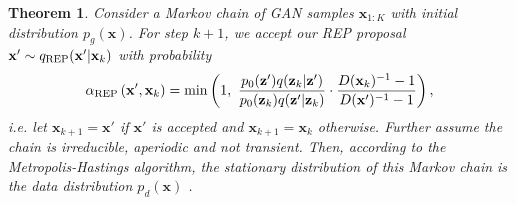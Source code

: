 \documentclass{article} %
\newcommand{\bx}{\mathbf{x}}
\newcommand{\bz}{\mathbf{z}}
\newcommand{\<}{\left\langle}
\renewcommand{\>}{\right\rangle}
\newtheorem{theorem}{Theorem}
\begin{document}
\begin{theorem}
\label{thm:emh}
Consider a Markov chain of GAN samples $\bx_{1:K}$ with initial distribution $p_g(\bx)$. For step $k+1$, we accept our REP proposal $\bx'\sim q_{\rm REP}(\bx'|\bx_k)$ with probability
\begin{equation}
\alpha_{\rm REP}\left(\mathbf{x}^{\prime}, \mathbf{x}_{k}\right)
=\min \left(1,~\frac{p_0(\bz')q(\bz_k|\bz')}{p_0(\bz_k)q(\bz'|\bz_k)}\cdot
\frac{D(\bx_k)^{-1}-1}{D(\bx')^{-1}-1}\right),
\label{eq:cmc-mh-acceptance}
\end{equation}
i.e. let $\bx_{k+1}=\bx'$ if $\bx'$ is accepted and $\bx_{k+1}=\bx_k$ otherwise. Further assume the chain is irreducible, aperiodic and not transient. Then, according to the Metropolis-Hastings algorithm, the stationary distribution of this Markov chain is the data distribution $p_d(\bx)$ \citep{gelman2013bayesian}.
\label{thm:main}
\end{theorem}
\end{document}
